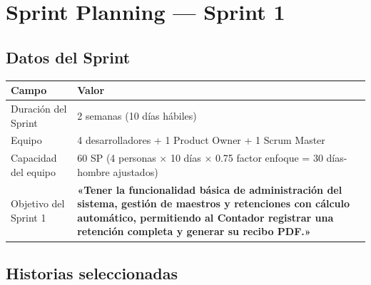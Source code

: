 \documentclass[stu]{apa7}
\begin{document}
\newpage

\section{Sprint Planning --- Sprint 1}

\subsection{Datos del Sprint}

\begin{longtable}{|L{4cm}|L{10cm}|}
\hline
{}
\textbf{Campo} & \textbf{Valor} \\
\hline
Duración del Sprint & 2 semanas (10 días hábiles) \\
\hline
Equipo & 4 desarrolladores + 1 Product Owner + 1 Scrum Master \\
\hline
Capacidad del equipo & 60 SP \newline (4 personas × 10 días × 0.75 factor enfoque = 30 días-hombre ajustados) \\
\hline
Objetivo del Sprint 1 & \textbf{«Tener la funcionalidad básica de administración del sistema, gestión de maestros y retenciones con cálculo automático, permitiendo al Contador registrar una retención completa y generar su recibo PDF.»} \\
\hline
\end{longtable}

\subsection{Historias seleccionadas}
\end{document}
